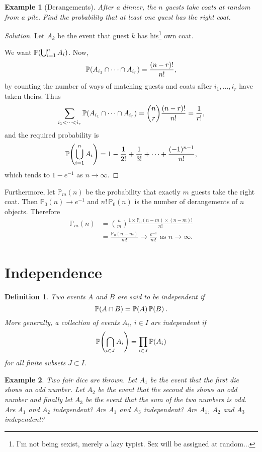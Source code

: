 \documentclass{notes}
\theoremstyle{plain}
\newtheorem*{example}{Example}
\newtheorem{definition}{Definition}[chapter]
\newcommand{\bP}{\mathbb{P}}
\newcommand{\prob}[1]{\bP \negthinspace\left(#1\right)}
\begin{document}
\begin{example}[Derangements]
After a dinner, the $n$ guests take coats at random from a pile.  Find the
probability that at least one guest has the right coat.
\end{example}

\begin{proof}[Solution]
Let $A_k$ be the event that guest $k$ has his\footnote{I'm not being
sexist, merely a lazy typist.  Sex will be assigned at random...} own coat.

We want $\prob{\bigcup_{i=1}^n A_i}$.  Now,
\[
\prob{A_{i_1} \cap \dots \cap A_{i_r}} = \frac{(n-r)!}{n!},
\]
by counting the number of ways of matching guests and coats after
$i_1, \dots, i_r$ have taken theirs.  Thus
\[
\sum_{i_1 < \dots < i_r} \prob{A_{i_1} \cap \dots \cap A_{i_r}} = 
\binom{n}{r} \frac{(n-r)!}{n!} = \frac{1}{r!},
\]
and the required probability is
\[
\prob{\bigcup_{i=1}^n A_i} = 1 - \frac{1}{2!} + \frac{1}{3!}
+ \dots + \frac{(-1)^{n-1}}{n!},
\]
which tends to $1 - e^{-1}$ as $n \rightarrow \infty$.
\end{proof}

Furthermore, let $\bP_m(n)$ be the probability that exactly $m$ guests
take the right coat.  Then $\bP_0(n) \rightarrow e^{-1}$ and
$n!\, \bP_0(n)$ is the number of derangements of $n$ objects.  Therefore
\begin{align*}
\bP_m(n) &= \binom{n}{m} \frac{1 \times \bP_0(n-m) \times (n-m)!}{n!}\\
& = \frac{\bP_0(n-m)}{m!} \rightarrow \frac{e^{-1}}{m!} \text{ as }
n \rightarrow \infty.
\end{align*}

\section{Independence}

\begin{definition}
Two events $A$ and $B$ are said to be independent if
\[
\prob{A \cap B} = \prob{A} \prob{B}.
\]  More generally, a collection of events $A_i$,
$i \in I$ are independent if
\[
\prob{\bigcap_{i \in J} A_i} = \prod_{i \in J} \prob{A_i}
\]
for all finite subsets $J \subset I$.
\end{definition}

\begin{example}
Two fair dice are thrown.  Let $A_1$ be the event that the first die shows
an odd number.  Let $A_2$ be the event that the second die shows an odd
number and finally let $A_3$ be the event that the sum of the two numbers
is odd.  Are $A_1$ and $A_2$ independent?  Are $A_1$ and $A_3$ independent?
Are $A_1$, $A_2$ and $A_3$ independent?
\end{example}
\end{document}
